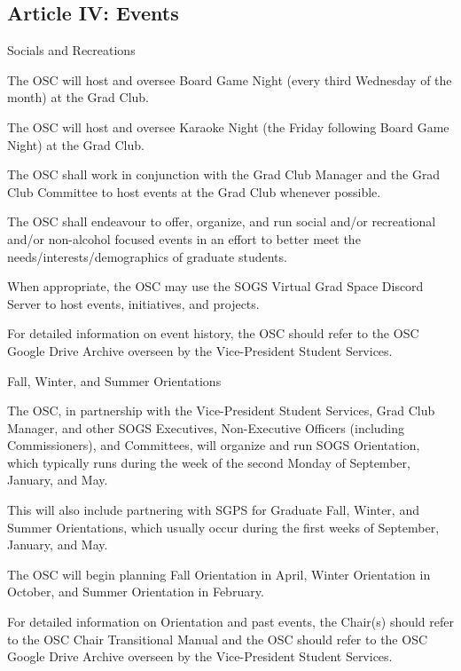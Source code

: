 \subsection{Article IV: Events}
\begin{longenum}[ label*=\thesubsection.\arabic*., align=left] 
	\item Socials and Recreations
		\begin{longenum}[label*=\arabic*., align=left]
		\item The OSC will host and oversee Board Game Night (every third Wednesday of the month) at the Grad Club.
		\item The OSC will host and oversee Karaoke Night (the Friday following Board Game Night) at the Grad Club.		
		\item The OSC shall work in conjunction with the Grad Club Manager and the Grad Club Committee to host events at the Grad Club whenever possible.
		\item The OSC shall endeavour to offer, organize, and run social and/or recreational and/or non-alcohol focused events in an effort to better meet the needs/interests/demographics of graduate students.
		\item When appropriate, the OSC may use the SOGS Virtual Grad Space Discord Server to host events, initiatives, and projects.
		\item For detailed information on event history, the OSC should refer to the OSC Google Drive Archive overseen by the Vice-President Student Services.
		\end{longenum}
	\item Fall, Winter, and Summer Orientations
		\begin{longenum}[label*=\arabic*., align=left]
		\item The OSC, in partnership with the Vice-President Student Services, Grad Club Manager, and other SOGS Executives, Non-Executive Officers (including Commissioners), and Committees, will organize and run SOGS Orientation, which typically runs during the week of the second Monday of September, January, and May.
			\begin{longenum}[label*=\arabic*., align=left]
			\item This will also include partnering with SGPS for Graduate Fall, Winter, and Summer Orientations, which usually occur during the first weeks of September, January, and May.
			\end{longenum}
		\item The OSC will begin planning Fall Orientation in April, Winter Orientation in October, and Summer Orientation in February.
		\item For detailed information on Orientation and past events, the Chair(s) should refer to the OSC Chair Transitional Manual and the OSC should refer to the OSC Google Drive Archive overseen by the Vice-President Student Services.
		\end{longenum}
\end{longenum}

